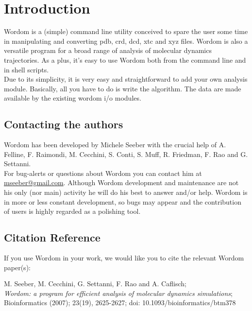 \documentclass[11pt,twoside,onecolumn,a4paper,openright,notitlepage]{book}[2001/04/21]
\begin{document}
\tableofcontents
\clearpage



\chapter{Introduction}

Wordom is a (simple) command line utility conceived to spare the user some time in manipulating and converting pdb, crd, dcd, xtc and xyz files. Wordom is also a versatile program for a broad range of analysis of molecular dynamics trajectories. As a plus, it's easy to use Wordom both from the command line and in shell scripts.\\
Due to its simplicity, it is very easy and straightforward to add your own analysis module. Basically, all you have to do is write the algorithm. The data are made available by the existing wordom i/o modules.

\section{Contacting the authors}
Wordom has been developed by Michele Seeber with the crucial help of A. Felline, F. Raimondi, M. Cecchini, S. Conti, S. Muff, R. Friedman, F. Rao and G. Settanni.\\
For bug-alerts or questions about Wordom you can contact him at \href{mailto:mseeber@unimore.it}{mseeber@gmail.com}. Although Wordom development and maintenance are not his only (nor main) activity he will do his best to answer and/or help. Wordom is in more or less constant development, so bugs may appear and the contribution of users is highly regarded as a polishing tool.


\section{Citation Reference}
If you use Wordom in your work, we would like you to cite the relevant Wordom paper(s)\cite{mseeber:wordom,mseeber:wordom2}:
\begin{center}
M. Seeber, M. Cecchini, G. Settanni, F. Rao and A. Caflisch; \\
\emph{Wordom: a program for efficient analysis of molecular dynamics simulations};\\
 Bioinformatics (2007); 23(19), 2625-2627; doi: 10.1093/bioinformatics/btm378
\end{center}
\end{document}
